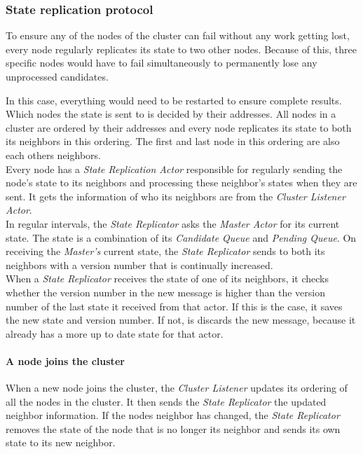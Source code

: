 \subsubsection{State replication protocol}\label{protocol:stateReplication}
  To ensure any of the nodes of the cluster can fail without any work getting lost, every node regularly replicates its state to two other nodes.
  Because of this, three specific nodes would have to fail simultaneously to permanently lose any unprocessed candidates.
  
  In this case, everything would need to be restarted to ensure complete results. \\
  Which nodes the state is sent to is decided by their addresses.
  All nodes in a cluster are ordered by their addresses and every node replicates its state to both its neighbors in this ordering.
  The first and last node in this ordering are also each others neighbors.\\
  Every node has a \emph{State Replication Actor} responsible for regularly sending the node's state to its neighbors and processing these neighbor's states when they are sent.
  It gets the information of who its neighbors are from the \emph{Cluster Listener Actor}. \\
  In regular intervals, the \emph{State Replicator} asks the \emph{Master Actor} for its current state.
  The state is a combination of its \emph{Candidate Queue} and \emph{Pending Queue}.
  On receiving the \emph{Master's} current state, the \emph{State Replicator} sends to both its neighbors with a version number that is continually increased.\\
  When a \emph{State Replicator} receives the state of one of its neighbors, it checks whether the version number in the new message is higher than the version number of the last state it received from that actor.
  If this is the case, it saves the new state and version number.
  If not, is discards the new message, because it already has a more up to date state for that actor.

  \paragraph{A node joins the cluster}
  When a new node joins the cluster, the \emph{Cluster Listener} updates its ordering of all the nodes in the cluster. 
  It then sends the \emph{State Replicator} the updated neighbor information.
  If the nodes neighbor has changed, the \emph{State Replicator} removes the state of the node that is no longer its neighbor and sends its own state to its new neighbor.
  
